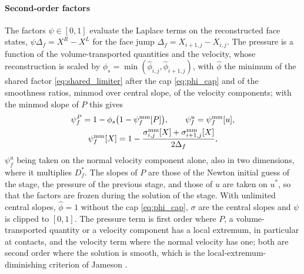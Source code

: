 \documentclass[a4paper,fleqn]{cas-sc}
\begin{document}
\paragraph{Second-order factors}
The factors $\psi\in[0,1]$ evaluate the Laplace terms on the reconstructed face states, $\psi\Delta_f=X^R-X^L$ for the face jump
$\Delta_f=X_{i+1,j}-X_{i,j}$. The pressure is a function of the volume-transported quantities and the velocity, whose reconstruction is scaled by
$\phi_s=\min(\hat\phi_{i,j},\hat\phi_{i+1,j})$, with $\hat\phi$ the minimum of the shared factor \eqref{eq:shared_limiter} after the cap \eqref{eq:phi_cap} and of the smoothness ratios,
minmod over central slope, of the velocity components; with the minmod slope of $P$ this gives
\begin{equation}
\begin{gathered}
\psi^P_f=1-\phi_s\big(1-\psi^{\rm mm}_f[P]\big),\qquad \psi^u_f=\psi^{\rm mm}_f[u],\\
\psi^{\rm mm}_f[X]=1-\frac{\sigma^{\rm mm}_{i,j}[X]+\sigma^{\rm mm}_{i+1,j}[X]}{2\Delta_f},
\end{gathered}
\label{eq:psi}
\end{equation}
$\psi^u_f$ being taken on the normal velocity component alone, also in two dimensions, where it multiplies $D^*_f$. The slopes of $P$ are those of the Newton initial guess of the stage, the pressure
of the previous stage, and those of $u$ are taken on $u^*$, so that the factors are frozen during the solution of the stage.
With unlimited central slopes, $\hat\phi=1$ without the cap \eqref{eq:phi_cap}, $\sigma$ are the central slopes and $\psi$ is clipped to $[0,1]$. The
pressure term is first order where $P$, a volume-transported quantity or a velocity component has a local extremum, in
particular at contacts, and the velocity term where the normal velocity has one; both are second order where the
solution is smooth, which is the local-extremum-diminishing criterion of Jameson \cite{Jameson1995}.
\end{document}
